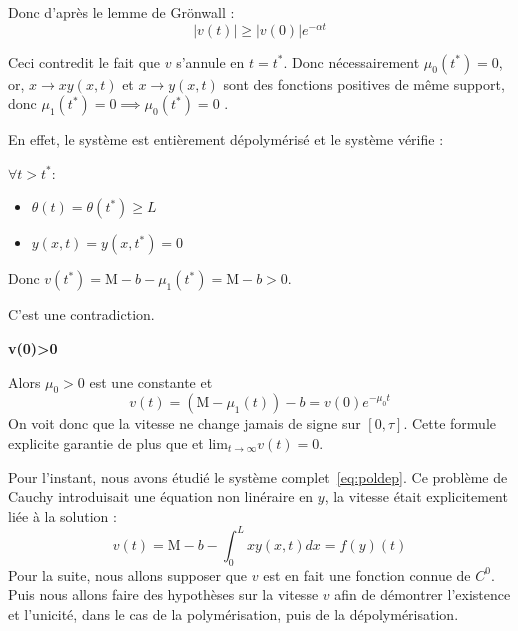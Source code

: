 \documentclass[a4paper]{article}
\newcommand{\mass}{\mathrm{M}}
\newcommand{\dep}{b}
\begin{document}
\begin{preuve}
	Donc d'après le lemme de Grönwall :
	\[ |v(t)| \geq |v(0)| e^{-\alpha t} \]
	
	Ceci contredit le fait que $v$ s'annule en $t=t^*$.
	Donc nécessairement $\mu_0(t^*) = 0$, 
	or, $x \to xy (x,t)$ et $x \to y(x,t)$ sont des fonctions positives de même support,
	donc $\mu_1(t^*) =0 \implies \mu_0(t^*)=0$ .
	
	En effet, le système est entièrement dépolymérisé et le système vérifie :
	
	$\forall t>t^*$:
	\begin{itemize}
		\item $\theta(t)= \theta(t^*) \geq L $
		\item $y(x,t)=y(x,t^*)= 0$
	\end{itemize}
	
	Donc $v(t^*) = \mass - \dep - \mu_1(t^*) = \mass- \dep > 0$.
	
	C'est une contradiction.	
	
	
	\vspace{0.3cm}
	\textbf{v(0)>0}
 	
	Alors $\mu_0>0$ est une constante et 
 	\[ v(t) = ( \mass - \mu_1 (t)) - \dep = v(0)e^{- \mu_0 t} \]
 	On voit donc que la vitesse ne change jamais de signe sur $[0,\tau]$.
	Cette formule explicite garantie de plus que et $\mathrm{lim}_{t \rightarrow \infty} v(t) = 0$.
	
\end{preuve}


\begin{remarque}
Pour l'instant, nous avons étudié le système complet~\eqref{eq:poldep}. 
Ce problème de Cauchy introduisait une équation non linéraire en $y$, 
la vitesse était explicitement liée à la solution :
\[ v(t) = \mass - \dep - \int_0^L xy(x,t)dx = f(y)(t) \]
Pour la suite, nous allons supposer que $v$ est en fait une fonction connue de $C^0$.
Puis nous allons faire des hypothèses sur la vitesse $v$ 
afin de démontrer l'existence et l'unicité, dans le cas de la polymérisation, puis de la dépolymérisation.
\end{remarque}





\end{document}
